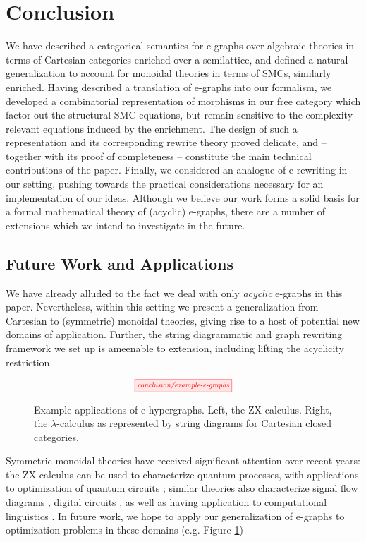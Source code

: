 

\section{Conclusion}

We have described a categorical semantics for e-graphs over algebraic theories in terms of Cartesian categories enriched over a semilattice, and defined a natural generalization to account for monoidal theories in terms of SMCs,  similarly enriched.  Having described a translation of e-graphs into our formalism, we developed a combinatorial representation of morphisms in our free category which factor out the structural SMC equations, but remain sensitive to the complexity-relevant equations induced by the enrichment.  The design of such a representation and its corresponding  rewrite theory proved delicate, and -- together with its proof of completeness -- constitute the main technical contributions of the paper.  Finally, we considered an analogue of e-rewriting in our setting, pushing towards the practical considerations necessary for an implementation of our ideas.  Although we believe our work forms a solid basis for a formal mathematical theory of (acyclic) e-graphs,  there are a number of extensions which we intend to investigate in the future.

\subsection{Future Work and Applications}

We have already alluded to the fact we deal with only \textit{acyclic} e-graphs in this paper.  Nevertheless,  within this setting we present a generalization from Cartesian to (symmetric) monoidal theories,  giving rise to a host of potential new domains of application.  Further,  the string diagrammatic and graph rewriting framework we set up is ameenable to extension, including lifting the acyclicity restriction. 

\begin{figure}\label{fig:applications}
\[
	\scalebox{0.75}{
	\tikzfig{conclusion/example-e-graphs}
	}
\]
\caption{Example applications of e-hypergraphs.  Left, the ZX-calculus.  Right, the $\lambda$-calculus as represented by string diagrams for Cartesian closed categories.  }
\end{figure}

Symmetric monoidal theories have received significant attention over recent years: the ZX-calculus can be used to characterize quantum processes, with applications to optimization of quantum circuits \cite{coecke_interacting_2011,ZX} ; similar theories also characterize signal flow diagrams 
\cite{baldan_categorical_2014}, digital circuits 
\cite{ghica_operational_2021}, as well as having application to computational linguistics \cite{wazni_quantum_2022,coecke_lambek_2013}.  In future work, we hope to apply our generalization of e-graphs to optimization problems in these domains (e.g. Figure \ref{fig:applications})

